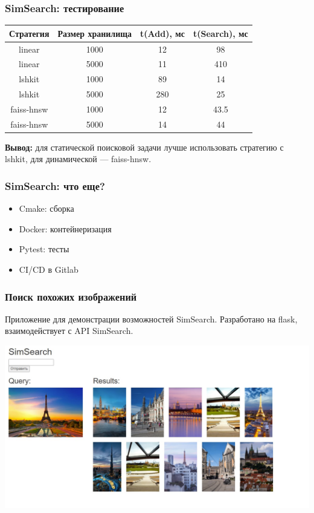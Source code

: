 \documentclass{beamer}
\begin{document}
\begin{frame}
\frametitle{SimSearch: тестирование}

\centering
\begin{tabular}{|c|c|c|c|}
\hline
    Стратегия & Размер хранилища &  t(Add), мс & t(Search), мс \\
     \hline
    linear & 1000 & 12 & 98 \\
    \hline 
    linear & 5000 & 11 & 410 \\
    \hline 
    lshkit & 1000 & 89 & 14 \\
    \hline 
    lshkit & 5000 & 280 & 25 \\
    \hline 
    faiss-hnsw & 1000 & 12 & 43.5 \\
    \hline 
    faiss-hnsw & 5000 & 14 & 44 \\
    \hline 
\end{tabular}

\hfill

\textbf{Вывод:} для статической поисковой задачи лучше использовать стратегию с lshkit, для динамической --- faiss-hnsw.

\end{frame}

\begin{frame}
\frametitle{SimSearch: что еще?}

\begin{itemize}
\item Cmake: сборка
\item Docker: контейнеризация
\item Pytest: тесты
\item CI/CD в Gitlab  
\end{itemize}

\end{frame}

\begin{frame}
\frametitle{Поиск похожих изображений}

Приложение для демонстрации возможностей SimSearch. Разработано на flask, взаимодействует с API SimSearch.

\begin{center}
\includegraphics[width=\linewidth]{img/simsearch_paris.jpg}

\end{center}


\end{frame}
\end{document}
